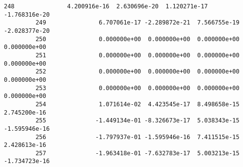 \documentclass[11pt]{article}
\begin{document}
\begin{Verbatim}[commandchars=\\\{\}]
         248               4.200916e-16  2.630696e-20  1.120271e-17    -1.768316e-20   
         249               6.707061e-17 -2.289872e-21  7.566755e-19    -2.028377e-20   
         250               0.000000e+00  0.000000e+00  0.000000e+00     0.000000e+00   
         251               0.000000e+00  0.000000e+00  0.000000e+00     0.000000e+00   
         252               0.000000e+00  0.000000e+00  0.000000e+00     0.000000e+00   
         253               0.000000e+00  0.000000e+00  0.000000e+00     0.000000e+00   
         254               1.071614e-02  4.423545e-17  8.498658e-15     2.745200e-16   
         255              -1.449134e-01 -8.326673e-17  5.038343e-15    -1.595946e-16   
         256              -1.797937e-01 -1.595946e-16  7.411515e-15     2.428613e-16   
         257              -1.963418e-01 -7.632783e-17  5.003213e-15    -1.734723e-16   
         

\end{Verbatim}
\end{document}
